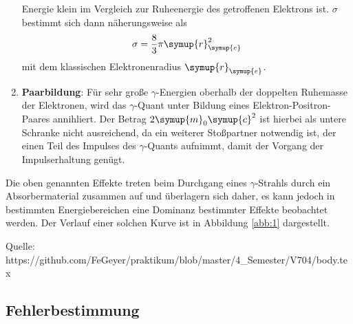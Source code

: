 \begin{enumerate}
  Energie klein im Vergleich zur Ruheenergie des getroffenen Elektrons ist. $\sigma$ bestimmt sich
  dann näherungsweise als
  \begin{equation}
    \sigma = \frac{8}{3} \pi \symup{r}_{\symup{e}}^2
  \end{equation}
  mit dem klassischen Elektronenradius $\symup{r}_{\symup{e}}$.
  \item \textbf{Paarbildung}: Für sehr große $\gamma$-Energien oberhalb der doppelten
  Ruhemasse der Elektronen, wird das $\gamma$-Quant unter Bildung eines Elektron-Positron-Paares
  annihliert. Der Betrag $2 \symup{m}_0 \symup{c}^2$ ist hierbei als untere Schranke
  nicht ausreichend, da ein weiterer Stoßpartner notwendig ist, der einen Teil des Impulses
  des $\gamma$-Quants aufnimmt, damit der Vorgang der Impulserhaltung genügt.
\end{enumerate}
Die oben genannten Effekte treten beim Durchgang eines $\gamma$-Strahls durch ein
Absorbermaterial zusammen auf und überlagern sich daher, es kann jedoch in bestimmten
Energiebereichen eine Dominanz bestimmter Effekte beobachtet werden. Der Verlauf einer solchen
Kurve ist in Abbildung \ref{abb:1} dargestellt.


Quelle: https://github.com/FeGeyer/praktikum/blob/master/4_Semester/V704/body.tex


\subsection{Fehlerbestimmung}